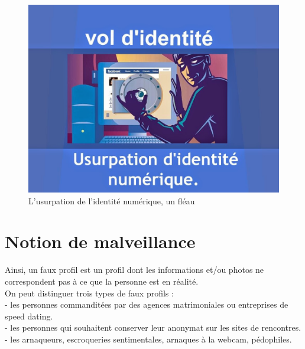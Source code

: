 \documentclass[12pt]{report}
\begin{document}
\begin{figure}[h]
\begin{center}
    \includegraphics[width=150mm]{UsurpationIdentiteNumerique.jpg}
    \end{center}
    \caption{L'usurpation de l'identité numérique, un fléau}
\label{fig:L'usurpation de l'identité numérique, un fléau}
  \end{figure}

\newpage
\section{Notion de malveillance}
Ainsi, un faux profil est un profil dont les informations et/ou photos ne correspondent pas à ce que la personne est en réalité. \\

On peut distinguer trois types de faux profils : \\ 
- les personnes commanditées par des agences matrimoniales ou entreprises de speed dating.\\
- les personnes qui souhaitent conserver leur anonymat sur les sites de rencontres.\\
- les arnaqueurs, escroqueries sentimentales, arnaques à la webcam, pédophiles.\\
\end{document}
